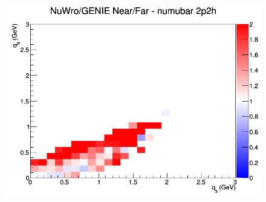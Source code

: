 \begin{figure}[h]
\endminipage
{}
\includegraphics[width=\linewidth]{eff_q0_q3/LAr/ratios/2p2h_NuWro_GENIE_numubar_NF_q3_q0.png}
\endminipage
\newline
\end{figure}
\clearpage
